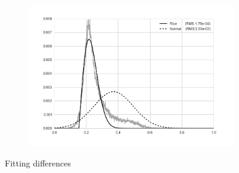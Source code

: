 \begin{figure}[t]
\begin{subfigure}[b]{0.30\textwidth}
        \centering
        \includegraphics[width=\textwidth]{14}
    \end{subfigure}
    \caption {Fitting differences}
    \label{fig:rice-norm-diff}
\end{figure}




